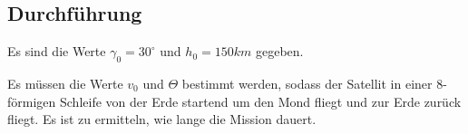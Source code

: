 \documentclass[]{scrartcl}
\begin{document}
\subsection{Durchführung}
Es sind die Werte $\gamma_{0} = 30^\circ$ und $h_{0} = 150km$ gegeben.

Es müssen die Werte $v_{0}$ und $\Theta$ bestimmt werden, sodass der Satellit in einer 8-förmigen Schleife von der Erde startend um den Mond fliegt und zur Erde zurück fliegt. Es ist zu ermitteln, wie lange die Mission dauert.
\end{document}
